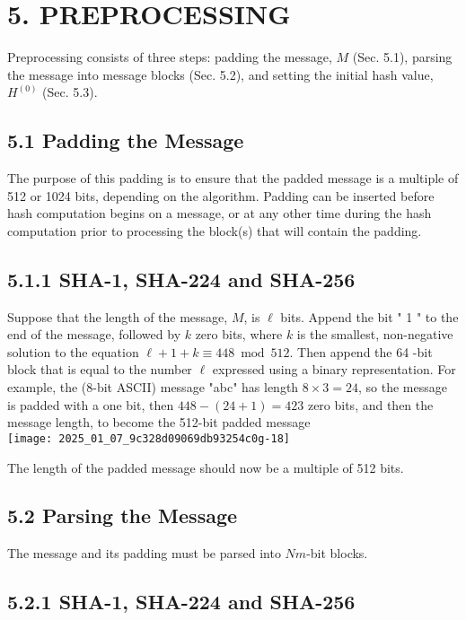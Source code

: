 \section*{5. PREPROCESSING}

Preprocessing consists of three steps: padding the message, \(M\) (Sec. 5.1), parsing the message into message blocks (Sec. 5.2), and setting the initial hash value, \(H^{(0)}\) (Sec. 5.3).

\subsection*{5.1 Padding the Message}

The purpose of this padding is to ensure that the padded message is a multiple of 512 or 1024 bits, depending on the algorithm. Padding can be inserted before hash computation begins on a message, or at any other time during the hash computation prior to processing the block(s) that will contain the padding.

\subsection*{5.1.1 SHA-1, SHA-224 and SHA-256}

Suppose that the length of the message, \(M\), is \(\ell\) bits. Append the bit " 1 " to the end of the message, followed by \(k\) zero bits, where \(k\) is the smallest, non-negative solution to the equation \(\ell+1+k \equiv 448 \bmod 512\). Then append the 64 -bit block that is equal to the number \(\ell\) expressed using a binary representation. For example, the (8-bit ASCII) message "abc" has length \(8 \times 3=24\), so the message is padded with a one bit, then \(448-(24+1)=423\) zero bits, and then the message length, to become the 512-bit padded message\\

\texttt{[image: 2025\_01\_07\_9c328d09069db93254c0g-18]}

The length of the padded message should now be a multiple of 512 bits.

\subsection*{5.2 Parsing the Message}

The message and its padding must be parsed into \(N m\)-bit blocks.

\subsection*{5.2.1 SHA-1, SHA-224 and SHA-256}

